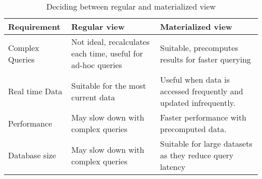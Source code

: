 \begin{table}[h!]
  \centering
  \caption{Deciding between regular and materialized view}\vspace{.4cm}
  
  \label{tab:view-comparison}
  \begin{tabular}{|p{}|p{}|p{}|}
    \hline
    \textbf{Requirement} & \textbf{Regular view} & \textbf{Materialized view} \\
    \hline
    Complex Queries\ & Not ideal, recalculates each time, useful for ad-hoc queries\ & Suitable, precomputes results for faster querying \\
    \hline
     Real time Data & Suitable for the most current data  &  Useful when data is accessed frequently and updated infrequently. \\
    \hline
    Performance & May slow down with complex queries  &  Faster performance with precomputed data. \\
    \hline
    Database size & May slow down with complex queries  &  Suitable for large datasets as they reduce query latency \\
    \hline
  \end{tabular}
\end{table}